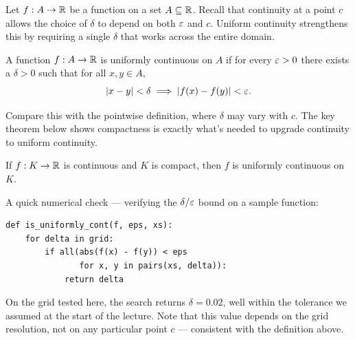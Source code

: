 \documentclass{mathnotes}
\begin{document}

Let $f: A \to \mathbb{R}$ be a function on a set $A \subseteq \mathbb{R}$. Recall that continuity
at a point $c$ allows the choice of $\delta$ to depend on both $\varepsilon$ and $c$.
Uniform continuity strengthens this by requiring a single $\delta$ that works
across the entire domain.

\begin{definition}
A function $f: A \to \mathbb{R}$ is uniformly continuous on $A$ if for every
$\varepsilon > 0$ there exists a $\delta > 0$ such that for all $x, y \in A$,
\[
  |x - y| < \delta \implies |f(x) - f(y)| < \varepsilon.
\]
\end{definition}

Compare this with the pointwise definition, where $\delta$ may vary with $c$.
The key theorem below shows compactness is exactly what's needed to upgrade
continuity to uniform continuity.

\begin{theorem}
If $f: K \to \mathbb{R}$ is continuous and $K$ is compact, then $f$ is uniformly
continuous on $K$.
\end{theorem}

A quick numerical check --- verifying the $\delta/\varepsilon$ bound on a sample function:

\begin{lstlisting}
def is_uniformly_cont(f, eps, xs):
    for delta in grid:
        if all(abs(f(x) - f(y)) < eps
               for x, y in pairs(xs, delta)):
            return delta
\end{lstlisting}

On the grid tested here, the search returns $\delta = 0.02$, well within the
tolerance we assumed at the start of the lecture. Note that this value depends
on the grid resolution, not on any particular point $c$ --- consistent with
the definition above.
\end{document}
